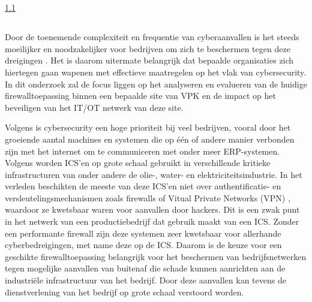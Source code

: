 
\chapter{}%
\label{ch:inleiding}
\ref{sec:probleemstelling}
\section{}%
\label{sec:probleemstelling}

Door de toenemende complexiteit en frequentie van cyberaanvallen is het steeds moeilijker en noodzakelijker voor bedrijven om zich te beschermen tegen deze dreigingen \autocite{saravanan2019}. Het is daarom uitermate belangrijk dat bepaalde organisaties zich hiertegen gaan wapenen met effectieve maatregelen op het vlak van cybersecurity. In dit onderzoek zal de focus liggen op het analyseren en evalueren van de huidige  firewalltoepassing binnen een bepaalde site van VPK en de impact op het beveiligen van het IT/OT netwerk van deze site.

\vspace{5mm}
Volgens \textcite{pan2017} is cybersecurity een hoge prioriteit bij veel bedrijven, vooral door het groeiende aantal machines en systemen die op één of andere manier verbonden zijn met het internet om te communiceren met onder meer ERP-systemen.  Volgens \textcite{Lin2017} worden ICS'en op grote schaal gebruikt in verschillende kritieke infrastructuren van onder andere de olie-, water- en elektriciteitsindustrie. In het verleden beschikten de meeste van deze ICS'en niet over authentificatie- en versleutelingsmechanismen zoals firewalls of Vitual Private Networks (VPN) , waardoor ze kwetsbaar waren voor aanvallen door hackers. Dit is een zwak punt in het netwerk van een productiebedrijf dat gebruik maakt van een ICS. Zonder een performante firewall zijn deze systemen zeer kwetsbaar voor allerhande cyberbedreigingen, met name deze op de ICS. Daarom is de keuze voor een geschikte firewalltoepassing belangrijk voor het beschermen van bedrijfsnetwerken tegen mogelijke aanvallen van buitenaf die schade kunnen aanrichten aan de industriële infrastructuur van het bedrijf. Door deze aanvallen kan tevens de dienstverlening van het bedrijf op grote schaal verstoord worden. 

